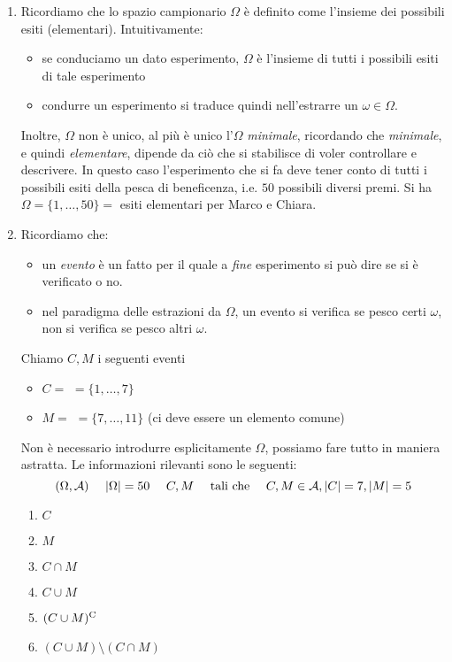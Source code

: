\begin{enumerate}
	\item Ricordiamo che lo spazio campionario $\Omega $ è definito come l'insieme dei possibili esiti (elementari). Intuitivamente:
	\begin{itemize}
		\item se conduciamo un dato esperimento, $\Omega $ è l'insieme di tutti i possibili esiti di tale esperimento
		\item condurre un esperimento si traduce quindi nell'estrarre un $\omega \in \Omega $.
	\end{itemize}

Inoltre, $\Omega $ non è unico, al più è unico l'$\Omega $ \textit{minimale}, ricordando che \textit{minimale}, e quindi \textit{elementare}, dipende da ciò che si stabilisce di voler controllare e descrivere. In questo caso l'esperimento che si fa deve tener conto di tutti i possibili esiti della pesca di beneficenza, i.e. $50$ possibili diversi premi. Si ha $\Omega =\{1,\dots ,50\} =$ esiti elementari per Marco e Chiara.
	\item Ricordiamo che:
	\begin{itemize}
		\item un \textit{evento} è un fatto per il quale a \textit{fine} esperimento si può dire se si è verificato o no.
		\item nel paradigma delle estrazioni da $\Omega $, un evento si verifica se pesco certi $\omega $, non si verifica se pesco altri $\omega $.
	\end{itemize}

	Chiamo $C,M$ i seguenti eventi
	\begin{itemize}
		\item $C=$  $=\{1,\dots ,7\}$
		\item $M=$  $=\{7,\dots ,11\}$ (ci deve essere un elemento comune)
	\end{itemize}

\begin{oss}
Non è necessario introdurre esplicitamente $\Omega $, possiamo fare tutto in maniera astratta. Le informazioni rilevanti sono le seguenti:
\begin{equation*}
(\Omega ,\mathcal{A}) \ \ \ \ |\Omega| =50\ \ \ \ C,M\ \ \ \ \text{tali che} \ \ \ \ C,M\in \mathcal{A} ,| C| =7,| M| =5
\end{equation*}
\end{oss}
\begin{enumerate}
	\item $C$
	\item $M$
	\item $C\cap M$
	\item $C\cup M$
	\item $( C\cup M)^{\mathrm{C}}$
	\item $( C\cup M) \setminus ( C\cap M)$
\end{enumerate}


\end{enumerate}
